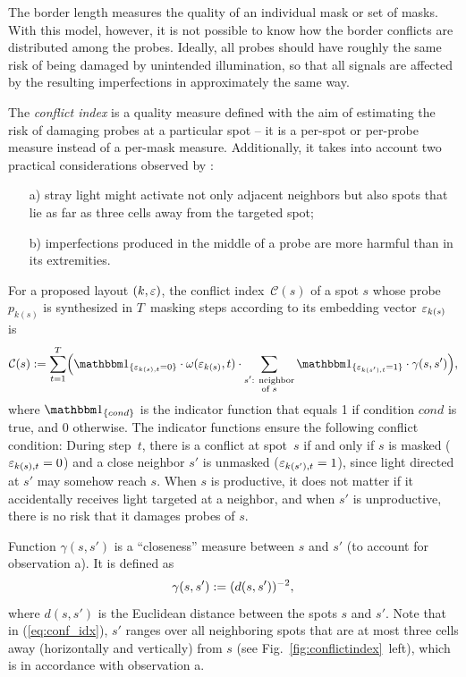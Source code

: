 The border length measures the quality of an individual mask or set of masks.
With this model, however, it is not possible to know how the border conflicts
are distributed among the probes. Ideally, all probes should have roughly the
same risk of being damaged by unintended illumination, so that all signals are
affected by the resulting imperfections in approximately the same way.

The \emph{conflict index} is a quality measure defined with the aim of
estimating the risk of damaging probes at a particular spot
\citep{Carvalho2006a} -- it is a per-spot or per-probe measure instead
of a per-mask measure.  Additionally, it takes into account two
practical considerations observed by \citet{Kahng2003}:
\begin{itemize}
\item[a)] stray light might activate not only adjacent neighbors but
  also spots that lie as far as three cells away from the targeted
  spot;
\item[b)] imperfections produced in the middle of a probe are more
  harmful than in its extremities.
\end{itemize}

For a proposed layout $(k,\varepsilon)$, the conflict index~$\mathcal{C}(s)$
of a spot $s$ whose probe $p_{k(s)}$ is synthesized in $T$~masking
steps according to its embedding vector $\varepsilon_{k(s)}$ is
\begin{equation}
\label{eq:conf_idx}
\mathcal{C}(s) := \sum_{t=1}^{T} \Bigl(
  \Ind{\eps_{k(s),t}=0}
  \cdot \omega(\eps_{k(s)},t)
  \cdot \sum_{\substack{s'\text{: neighbor}\\\text{of } s}}
  \Ind{\eps_{k(s'),t}=1}
  \cdot \gamma(s,s') \Bigr),
\end{equation}
where $\Ind{cond}$ is the indicator function that equals 1 if condition
$cond$ is true, and 0 otherwise. The indicator functions ensure the following
conflict condition: During step~$t$, there is a conflict at spot~$s$ if and
only if $s$ is masked ($\varepsilon_{k(s),t}=0$) and a close neighbor
$s'$ is unmasked ($\varepsilon_{k(s'),t}=1$), since light directed at
$s'$ may somehow reach $s$.  When $s$ is productive, it does not matter
if it accidentally receives light targeted at a neighbor, and when $s'$ is
unproductive, there is no risk that it damages probes of $s$.

Function $\gamma(s,s')$ is a ``closeness'' measure between $s$ and $s'$ (to
account for observation a). It is defined as
\begin{equation}\label{eq:dist_weight}
\gamma(s,s') := (d(s,s'))^{-2},\nopagebreak
\end{equation}\nopagebreak
where $d(s,s')$ is the Euclidean distance between the spots $s$ and $s'$. Note
that in (\ref{eq:conf_idx}), $s'$ ranges over all neighboring spots that are at
most three cells away (horizontally and vertically) from $s$ (see
Fig.~\ref{fig:conflictindex}~left), which is in accordance with observation a.

